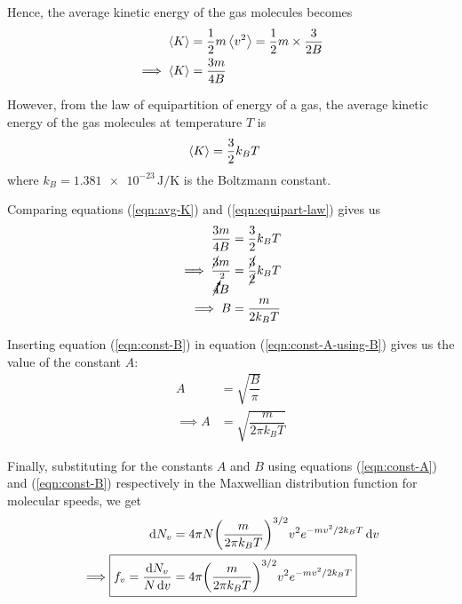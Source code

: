 			Hence, the average kinetic energy of the gas molecules becomes
			\begin{align}
				\expval{K}&=\dfrac{1}{2}m\expval{v^2}=\dfrac{1}{2}m\times\dfrac{3}{2B} \nonumber\\
				\implies\expval{K}&=\dfrac{3m}{4B} \label{eqn:avg-K}
			\end{align}
			
			However, from the law of equipartition of energy of a gas, the average kinetic energy of the gas molecules at temperature $T$ is
			\begin{align}
				\expval{K}&=\dfrac{3}{2}k_BT \label{eqn:equipart-law}
			\end{align}
			where $k_B=\num{1.381e-23}\,\unit{\joule\per\kelvin}$ is the Boltzmann constant.
			
			Comparing equations (\ref{eqn:avg-K}) and (\ref{eqn:equipart-law}) gives us
			\begin{align}
				\dfrac{3m}{4B}&=\dfrac{3}{2}k_BT \nonumber\\
				\implies\dfrac{\cancel{3}m}{\cancelto{2}{4}B}&=\dfrac{\cancel{3}}{\cancel{2}}k_BT \nonumber\\
				\implies B&=\dfrac{m}{2k_BT} \label{eqn:const-B}
			\end{align}
			
			Inserting equation (\ref{eqn:const-B}) in equation (\ref{eqn:const-A-using-B}) gives us the value of the constant $A$:
			\begin{align}
				A&=\sqrt{\dfrac{B}{\pi}} \nonumber\\
				\implies A&=\sqrt{\dfrac{m}{2\pi k_BT}} \label{eqn:const-A}
			\end{align}
			
			Finally, substituting for the constants $A$ and $B$ using equations (\ref{eqn:const-A}) and (\ref{eqn:const-B}) respectively in the Maxwellian distribution function for molecular speeds, we get
			\begin{align}
				\dd{N_v}&=4\pi N\qty(\dfrac{m}{2\pi k_BT})^{3/2}v^2e^{-mv^2/2k_BT}\dd{v} \nonumber\\
				\implies\Aboxed{f_v=\dfrac{\dd{N_v}}{N\dd{v}}&=4\pi\qty(\dfrac{m}{2\pi k_BT})^{3/2}v^2e^{-mv^2/2k_BT}} \label{eqn:Maxwell-distn:fv}
			\end{align}
			

